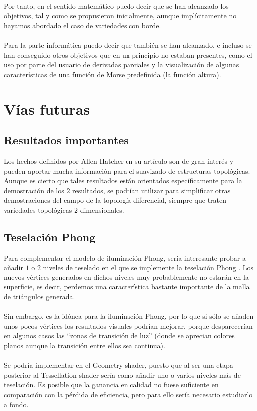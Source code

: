 \\Por tanto, en el sentido matemático puedo decir que se han alcanzado los objetivos, tal y como se propusieron inicialmente, aunque implícitamente no hayamos abordado el caso de variedades con borde.\\
\\Para la parte informática puedo decir que también se han alcanzado, e incluso se han conseguido otros objetivos que en un principio no estaban presentes, como el uso por parte del usuario de derivadas parciales y la visualización de algunas características de una función de Morse predefinida (la función altura).\\

\section*{Vías futuras}

\subsection*{Resultados importantes}
Los hechos definidos por Allen Hatcher en su artículo son de gran interés y pueden aportar mucha información para el suavizado de estructuras topológicas. Aunque es cierto que tales resultados están orientados específicamente para la demostración de los $2$ resultados, se podrían utilizar para simplificar otras demostraciones del campo de la topología diferencial, siempre que traten variedades topológicas $2$-dimensionales.\\

\subsection*{Teselación Phong}
Para complementar el modelo de iluminación Phong, sería interesante probar a añadir $1$ o $2$ niveles de teselado en el que se implemente la teselación Phong \cite{PhongTess}. Los nuevos vértices generados en dichos niveles muy probablemente no estarán en la superficie, es decir, perdemos una característica bastante importante de la malla de triángulos generada.\\
\\Sin embargo, es la idónea para la iluminación Phong, por lo que si sólo se añaden unos pocos vértices los resultados visuales podrían mejorar, porque desparecerían en algunos casos las ``zonas de transición de luz'' (donde se aprecian colores planos aunque la transición entre ellos sea continua).\\
\\Se podría implementar en el Geometry shader, puesto que al ser una etapa posterior al Tessellation shader sería como añadir uno o varios niveles más de teselación. Es posible que la ganancia en calidad no fuese suficiente en comparación con la pérdida de eficiencia, pero para ello sería necesario estudiarlo a fondo.\\


